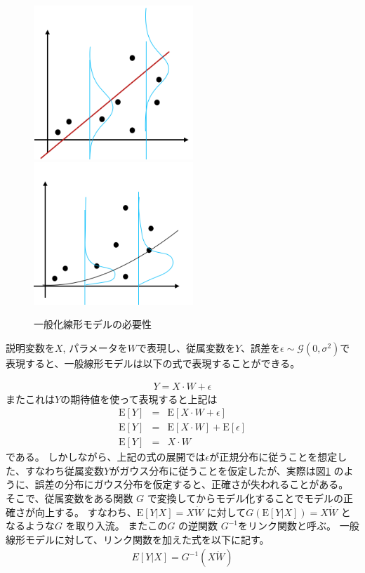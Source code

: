 \begin{figure}[hbtp]
        \includegraphics[width=6cm]{asset/glm1.png}~~~~~ ~~~~~ 
        \includegraphics[width=6cm]{asset/glm2.png}
            \caption{一般化線形モデルの必要性}
            \label{glm}
\end{figure}

説明変数を$ X $, パラメータを$ W $で表現し、従属変数を$ Y $、誤差を$ \epsilon \sim \mathcal{G}(0, \sigma^2) $で表現すると、一般線形モデルは以下の式で表現することができる。

\begin{eqnarray}
Y = X \cdot W + \epsilon
\label{eq:senkei}
\end{eqnarray}
またこれは$ Y $の期待値を使って表現すると上記は
\begin{eqnarray}
    \mathrm{E}[Y] &=& \mathrm{E}[X \cdot W + \epsilon] \\
    \mathrm{E}[Y] &=& \mathrm{E}[X \cdot W] + \mathrm{E}[\epsilon] \\
    \mathrm{E}[Y] &=& X \cdot W
\label{eq:link}
\end{eqnarray}
である。
しかしながら、上記の式の展開では$ \epsilon $が正規分布に従うことを想定した、すなわち従属変数$ Y $がガウス分布に従うことを仮定したが、実際は図\ref{glm} のように、誤差の分布にガウス分布を仮定すると、正確さが失われることがある。
そこで、従属変数をある関数 $ G $ で変換してからモデル化することでモデルの正確さが向上する。
すなわち、$ \mathrm{E}[Y|X] = X \dot W $ に対して$ G(\mathrm{E}[Y|X]) = X \dot W $ となるような$ G $ を取り入流。
またこの$ G $ の逆関数 $ G^{-1} $をリンク関数と呼ぶ。
一般線形モデルに対して、リンク関数を加えた式を以下に記す。
\begin{eqnarray}
E[Y|X]=G^{-1} (X\dot W)
\label{eq:link}
\end{eqnarray}

